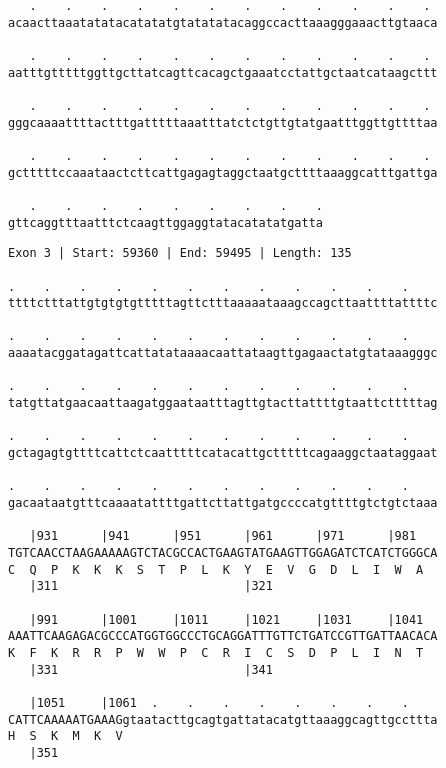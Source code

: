 \documentclass{article}
\begin{document}
\begin{Verbatim}
   .    .    .    .    .    .    .    .    .    .    .    . 
acaacttaaatatatacatatatgtatatatacaggccacttaaagggaaacttgtaaca
  
   .    .    .    .    .    .    .    .    .    .    .    . 
aatttgtttttggttgcttatcagttcacagctgaaatcctattgctaatcataagcttt
  
   .    .    .    .    .    .    .    .    .    .    .    . 
gggcaaaattttactttgatttttaaatttatctctgttgtatgaatttggttgttttaa
  
   .    .    .    .    .    .    .    .    .    .    .    . 
gctttttccaaataactcttcattgagagtaggctaatgcttttaaaggcatttgattga
  
   .    .    .    .    .    .    .    .    .
gttcaggtttaatttctcaagttggaggtatacatatatgatta
\end{Verbatim}
\newpage
\begin{Verbatim}
Exon 3 | Start: 59360 | End: 59495 | Length: 135
 
.    .    .    .    .    .    .    .    .    .    .    .    
ttttctttattgtgtgtgtttttagttctttaaaaataaagccagcttaattttattttc
  
.    .    .    .    .    .    .    .    .    .    .    .    
aaaatacggatagattcattatataaaacaattataagttgagaactatgtataaagggc
  
.    .    .    .    .    .    .    .    .    .    .    .    
tatgttatgaacaattaagatggaataatttagttgtacttattttgtaattctttttag
  
.    .    .    .    .    .    .    .    .    .    .    .    
gctagagtgttttcattctcaatttttcatacattgctttttcagaaggctaataggaat
  
.    .    .    .    .    .    .    .    .    .    .    .    
gacaataatgtttcaaaatattttgattcttattgatgccccatgttttgtctgtctaaa
  
   |931      |941      |951      |961      |971      |981   
TGTCAACCTAAGAAAAAGTCTACGCCACTGAAGTATGAAGTTGGAGATCTCATCTGGGCA
C  Q  P  K  K  K  S  T  P  L  K  Y  E  V  G  D  L  I  W  A  
   |311                          |321                       
  
   |991      |1001     |1011     |1021     |1031     |1041  
AAATTCAAGAGACGCCCATGGTGGCCCTGCAGGATTTGTTCTGATCCGTTGATTAACACA
K  F  K  R  R  P  W  W  P  C  R  I  C  S  D  P  L  I  N  T  
   |331                          |341                       
  
   |1051     |1061  .    .    .    .    .    .    .    .    
CATTCAAAAATGAAAGgtaatacttgcagtgattatacatgttaaaggcagttgccttta
H  S  K  M  K  V                                            
   |351                                                     
  

\end{Verbatim}
\end{document}
